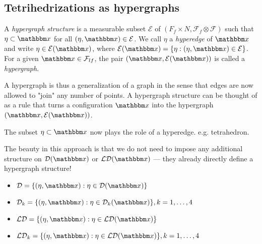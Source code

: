 \subsection{Tetrihedrizations as hypergraphs}
 
\begin{definition}
	A \textit{hypergraph structure} is a measurable subset $\mathcal E$ of $(F_f\times N, \mathcal F_f \otimes \mathcal F)$ such that $\eta \subset \x$ for all $(\eta,\x)\in\mathcal E$. We call $\eta$ a \textit{hyperedge} of $\x$ and write $\eta \in \mathcal E(\x)$, where $\mathcal E(\x) = \{\eta: (\eta,\x) \in \mathcal E\}$. For a given $\x \in \mathcal F_{lf}$, the pair $(\x, \mathcal E(\x))$ is called a \textit{hypergraph}.
\end{definition}
A hypergraph is thus a generalization of a graph in the sense that edges are now allowed to "join" any number of points. A hypergraph structure can be thought of as a rule that turns a configuration $\x$ into the hypergraph $(\x,\mathcal E(\x))$. 

The subset $\eta \subset \x$ now plays the role of a hyperedge. e.g. tetrahedron.

The beauty in this approach is that we do not need to impose any additional structure on $\mathcal D(\x)$ or $\mathcal {LD}(\x)$ --- they already directly define a hypergraph structure! 

\begin{definition}
	\begin{itemize}
		\item $\mathcal D = \{(\eta,\x): \eta \in \mathcal D(\x)\}$
		\item 	$\mathcal D_k = \{(\eta,\x): \eta \in \mathcal D_k(\x)\}, k=1,\dots,4$
		\item 	$\mathcal {LD} = \{(\eta,\x): \eta \in \mathcal {LD}(\x)\}$
		\item 	$\mathcal {LD}_k = \{(\eta,\x): \eta \in \mathcal {LD}(\x)\}, k=1,\dots,4$
	\end{itemize}
\end{definition}


